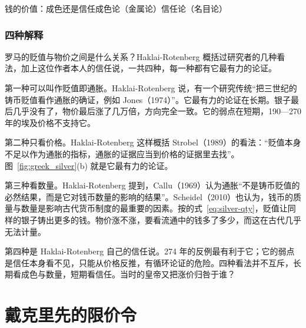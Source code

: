 \begin{compare}{钱的价值：成色还是信任}{成色论（金属论）}{信任论（名目论）}
\end{compare}

\subsubsection{四种解释}
罗马的贬值与物价之间是什么关系？Haklai-Rotenberg 概括过研究者的几种看法，加上这位作者本人的信任说，一共四种，每一种都有它最有力的论证。

第一种可以叫作贬值即通胀。Haklai-Rotenberg 说，有一个研究传统“把三世纪的铸币贬值看作通胀的确证，例如 Jones（1974）”\cite{haklai2011}。它最有力的论证在长期。银子最后几乎没有了，物价最后涨了几万倍，方向完全一致。它的弱点在短期，190—270 年的埃及价格不支持它。

第二种只看价格。Haklai-Rotenberg 这样概括 Strobel（1989）的看法：“贬值本身不足以作为通胀的指标，通胀的证据应当到价格的证据里去找”\cite{haklai2011}。图~\ref{fig:greek_silver}(b) 就是它最有力的论证。

第三种看数量。Haklai-Rotenberg 提到，Callu（1969）认为通胀“不是铸币贬值的必然结果，而是它对钱币数量的影响的结果”。Scheidel（2010）也认为，钱币的质量与数量是影响古代货币制度的最重要的因素\cite{haklai2011}。按的式~\eqref{eq:silver-qty}，贬值让同样的银子铸出更多的钱。物价涨不涨，要看流通中的钱多了多少，而这在古代几乎无法计量。

第四种是 Haklai-Rotenberg 自己的信任说。274 年的反例最有利于它；它的弱点是信任本身看不见，只能从价格反推，有循环论证的危险。四种看法并不互斥，长期看成色与数量，短期看信任。当时的皇帝又把涨价归咎于谁？

\section{戴克里先的限价令}\label{sec:greek-edict}

